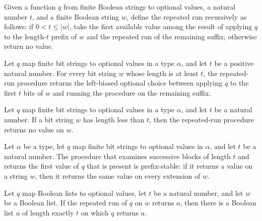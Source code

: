\begin{definition}
\label{Randomized.repeatRun}
\leanok
Given a function $q$ from finite Boolean strings to optional values, a natural number
$t$, and a finite Boolean string $w$, define the repeated run recursively as follows: if
$0<t\leq |w|$, take the first available value among the result of applying $q$ to the
length-$t$ prefix of $w$ and the repeated run of the remaining suffix; otherwise return
no value.
\end{definition}

\begin{theorem}
\label{Randomized.repeatRun_of_le}
\leanok
{}
Let $q$ map finite bit strings to optional values in a type $\alpha$, and let $t$ be a
positive natural number. For every bit string $w$ whose length is at least $t$, the
repeated-run procedure returns the left-biased optional choice between applying $q$ to
the first $t$ bits of $w$ and running the procedure on the remaining suffix.
\end{theorem}

\begin{theorem}
\label{Randomized.repeatRun_of_lt}
\leanok
{}
Let $q$ map finite bit strings to optional values in a type $\alpha$, and let $t$ be a
natural number. If a bit string $w$ has length less than $t$, then the repeated-run
procedure returns no value on $w$.
\end{theorem}

\begin{theorem}
\label{Randomized.repeatRun_isPrefixStable}
\leanok
{}
Let $\alpha$ be a type, let $q$ map finite bit strings to optional values in $\alpha$, and let
$t$ be a natural number. The procedure that examines successive blocks of length $t$ and
returns the first value of $q$ that is present is prefix-stable: if it returns a value
on a string $w$, then it returns the same value on every extension of $w$.
\end{theorem}

\begin{theorem}
\label{Randomized.exists_of_repeatRun_eq_some}
\leanok
{}
Let $q$ map Boolean lists to optional values, let $t$ be a natural number, and let $w$
be a Boolean list. If the repeated run of $q$ on $w$ returns $a$, then there is a
Boolean list $u$ of length exactly $t$ on which $q$ returns $a$.
\end{theorem}

